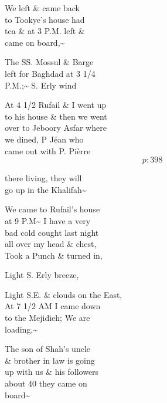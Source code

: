 \documentclass{report}
\begin{document}
	\par{
 	We left \& came back\ \\to Tookye’s house had\ \\tea \& at 3 P.M. left \&\ \\came on board,\~{}\ \\
	}

	\par{
 	The SS. Mossul \& Barge\ \\left for Baghdad at 3 1/4\ \\P.M.;\~{} S. Erly wind\ \\
	}

	\par{
 	At 4 1/2 Rufail \& I went up\ \\to his house \& then we went\ \\over to Jeboory Asfar where\ \\we dined, P Jéan who\ \\came out with P. Pièrre\ \\
  \[p: 398 \]

	}


	\par{
 	there living, they will\ \\go up in the Khalifah\~{}\ \\
	}

	\par{
 	We came to Rufail's house\ \\at 9 P.M\~{} I have a very\ \\bad cold cought last night\ \\all over my head \& chest,\ \\Took a Punch \& turned in,\ \\
	}

	\par{
 	Light S. Erly breeze,\ \\
	}

	\par{
 	Light S.E. \& clouds on the East,\ \\At 7 1/2 AM I came down\ \\to the Mejidieh; We are\ \\loading,\~{}\ \\
	}

	\par{
 	The son of Shah's uncle\ \\\& brother in law is going\ \\up with us \& his followers\ \\about 40 they came on\ \\board\~{}\ \\
	}
\end{document}
